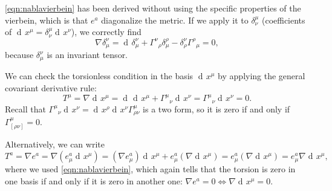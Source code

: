 \documentclass[a4paper,12pt]{book}
\newcommand{\dd}{\mathop{\mathrm{d}\!}{}}
\theoremstyle{definition}
\theoremstyle{remark}
\begin{document}
\cref{eqn:nablavierbein} has been derived without using the specific properties of the vierbein, which is that $e^a$ diagonalize the metric. If we apply it to $\delta^\mu_\nu$ (coefficients of $\dd x^\mu=\delta^\mu_\nu\dd x^\nu$), we correctly find
\[\nabla\delta^\nu_\mu=\dd\delta^\nu_\mu+\Gamma^\nu{}_\rho\delta^\rho_\mu-\delta^\nu_\rho\Gamma^\rho{}_\mu=0,\]
because $\delta^\nu_\mu$ is an invariant tensor.

We can check the torsionless condition in the basis $\dd x^\mu$ by applying the general covariant derivative rule:
\[T^\mu=\nabla\dd x^\mu=\dd\dd x^\mu+\Gamma^\mu{}_\nu\dd x^\nu=\Gamma^\mu{}_\nu\dd x^\nu=0.\]
Recall that $\Gamma^\mu{}_\nu\dd x^\nu=\dd x^\rho\dd x^\nu\Gamma^\mu_{\rho\nu}$ is a two form, so it is zero if and only if $\Gamma^\mu_{[\rho\nu]}=0$.

Alternatively, we can write
\[T^a=\nabla e^a=\nabla(e^a_\mu\dd x^\mu)=(\nabla e^a_\mu)\dd x^\mu+e^a_\mu(\nabla\dd x^\mu)=e^a_\mu(\nabla\dd x^\mu)=e^a_\mu\nabla\dd x^\mu,\]
where we used \cref{eqn:nablavierbein}, which again tells that the torsion is zero in one basis if and only if it is zero in another one: $\nabla e^a=0\iff\nabla\dd x^\mu=0$.
\end{document}
